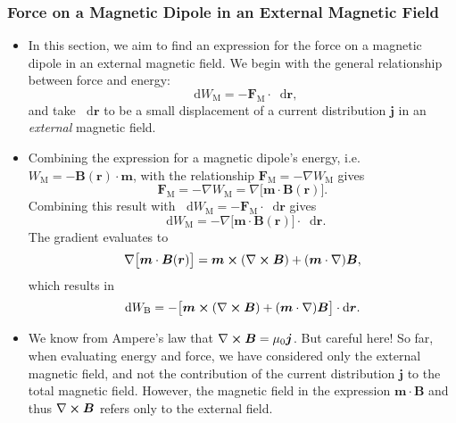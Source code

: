 \documentclass[11pt, a4paper]{article}
\newcommand{\diff}{\mathop{}\!\mathrm{d}} %
\renewcommand{\vec}[1]{\bm{#1}} %
\renewcommand{\r}{\vec{r}}
\newcommand{\B}{\vec{B}} %
\newcommand{\mm}{\mu_{0}}  %
\newcommand{\m}{\vec{m}}  %
\renewcommand{\j}{\vec{j}}  %
\renewcommand{\curl}{\nabla \cross}
\renewcommand{\grad}{\nabla}
\begin{document}
\begin{itemize}
\end{itemize}



\subsubsection{Force on a Magnetic Dipole in an External Magnetic Field}
\begin{itemize}
	\item In this section, we aim to find an expression for the force on a magnetic dipole in an external magnetic field. We begin with the general relationship between force and energy:
	\begin{equation*}
		\diff W_{\text{M}} = - \vec{F}_{\text{M}} \cdot \diff \r,
	\end{equation*}
	and take $ \diff \r $ to be a small displacement of a current distribution $ \j $ in an \textit{external} magnetic field.
	
    \item Combining the expression for a magnetic dipole's energy, i.e. $ W_{\text{M}} = - \B(\r) \cdot \m $, with the relationship $ \vec{F}_{\text{M}} = - \grad W_{\text{M}}  $ gives
    \begin{equation*}
        \vec{F}_{\text{M}} = - \grad W_{\text{M}} = \grad \big[ \m \cdot \B(\r) \big].
    \end{equation*}
    Combining this result with $ \diff W_{\text{M}} = - \vec{F}_{\text{M}} \cdot \diff \r $ gives
	\begin{equation*}
		\diff W_{\text{M}} = - \grad\big[\m \cdot \B(\r)\big] \cdot \diff \r.
	\end{equation*}
	The gradient evaluates to 
	\begin{equation*}
		\grad\big[\m \cdot \B(\r)\big] = \m \cross (\curl \B) + (\m \cdot \grad)\B,
	\end{equation*}
    which results in
    \begin{equation*}
        \diff W_{\text{B}} = - \big[ \m \cross (\curl \B) + (\m \cdot \grad)\B \big] \cdot \diff \r.
    \end{equation*}
    
	\item We know from Ampere's law that $ \curl \B = \mm \j $. But careful here! So far, when evaluating energy and force, we have considered only the external magnetic field, and not the contribution of the current distribution $ \j $ to the total magnetic field. However, the magnetic field in the expression $ \m \cdot \B $ and thus $ \curl \B $ refers only to the external field.
	

\end{itemize}
\end{document}

